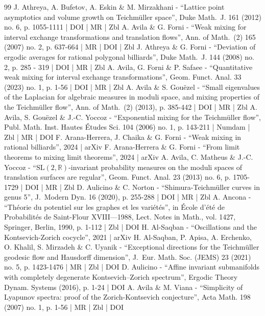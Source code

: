 \begin{thebibliography}{99}
J. Athreya, A. Bufetov, A. Eskin \& M. Mirzakhani - “Lattice point asymptotics and volume growth on Teichmüller space”, Duke Math. J. 161 (2012) no. 6, p. 1055-1111 | DOI | MR | Zbl
A. Avila \& G. Forni - “Weak mixing for interval exchange transformations and translation flows”, Ann. of Math. (2) 165 (2007) no. 2, p. 637-664 | MR | DOI | Zbl
J. Athreya \& G. Forni - “Deviation of ergodic averages for rational polygonal billiards”, Duke Math. J. 144 (2008) no. 2, p. 285 - 319 | DOI | MR | Zbl
A. Avila, G. Forni \& P. Safaee - “Quantitative weak mixing for interval exchange transformations”, Geom. Funct. Anal. 33 (2023) no. 1, p. 1-56 | DOI | MR | Zbl
A. Avila \& S. Gouëzel - “Small eigenvalues of the Laplacian for algebraic measures in moduli space, and mixing properties of the Teichmüller flow”, Ann. of Math. (2) (2013), p. 385-442 | DOI | MR | Zbl
A. Avila, S. Gouëzel \& J.-C. Yoccoz - “Exponential mixing for the Teichmüller flow”, Publ. Math. Inst. Hautes Études Sci. 104 (2006) no. 1, p. 143-211 | Numdam | Zbl | MR | DOI
F. Arana-Herrera, J. Chaika \& G. Forni - “Weak mixing in rational billiards”, 2024 | arXiv
F. Arana-Herrera \& G. Forni - “From limit theorems to mixing limit theorems”, 2024 | arXiv
A. Avila, C. Matheus \& J.-C. Yoccoz - “$\mathrm{SL}(2,\mathbb{R})$-invariant probability measures on the moduli spaces of translation surfaces are regular”, Geom. Funct. Anal. 23 (2013) no. 6, p. 1705-1729 | DOI | MR | Zbl
D. Aulicino \& C. Norton - “Shimura-Teichmüller curves in genus 5”, J. Modern Dyn. 16 (2020), p. 255-288 | DOI | MR | Zbl
A. Ancona - “Théorie du potentiel sur les graphes et les variétés”, in École d’été de Probabilités de Saint-Flour XVIII—1988, Lect. Notes in Math., vol. 1427, Springer, Berlin, 1990, p. 1-112 | Zbl | DOI
H. Al-Saqban - “Oscillations and the Kontsevich-Zorich cocycle”, 2021 | arXiv
H. Al-Saqban, P. Apisa, A. Erchenko, O. Khalil, S. Mirzadeh \& C. Uyanik - “Exceptional directions for the Teichmüller geodesic flow and Hausdorff dimension”, J. Eur. Math. Soc. (JEMS) 23 (2021) no. 5, p. 1423-1476 | MR | Zbl | DOI
D. Aulicino - “Affine invariant submanifolds with completely degenerate Kontsevich–Zorich spectrum”, Ergodic Theory Dynam. Systems (2016), p. 1-24 | DOI
A. Avila \& M. Viana - “Simplicity of Lyapunov spectra: proof of the Zorich-Kontsevich conjecture”, Acta Math. 198 (2007) no. 1, p. 1-56 | MR | Zbl | DOI

\end{thebibliography}
